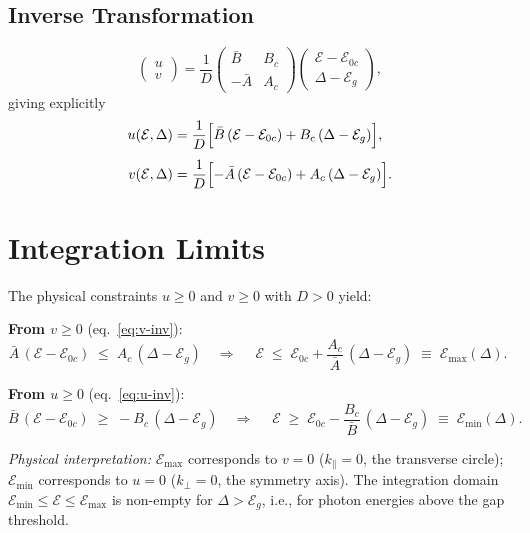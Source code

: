 \documentclass[11pt,a4paper]{article}
\newcommand{\E}{\mathcal{E}}              %
\newcommand{\Eoc}{\E_{0c}}
\newcommand{\Eg}{\E_g}
\newcommand{\Emax}{\E_{\max}}
\newcommand{\Emin}{\E_{\min}}
\newcommand{\Abar}{\bar{A}}
\newcommand{\Bbar}{\bar{B}}
\newcommand{\kperp}{k_{\!\perp}}
\newcommand{\kpar}{k_{\!\parallel}}
\begin{document}
\subsection{Inverse Transformation}

\begin{equation}\label{eq:inverse}
  \begin{pmatrix} u \\ v \end{pmatrix}
  = \frac{1}{D}
  \begin{pmatrix} \Bbar & B_c \\ -\Abar & A_c \end{pmatrix}
  \begin{pmatrix} \E - \Eoc \\ \Delta - \Eg \end{pmatrix},
\end{equation}
giving explicitly
\begin{align}
  u(\E, \Delta) &= \frac{1}{D}\Bigl[\Bbar\,(\E - \Eoc) + B_c\,(\Delta - \Eg)\Bigr], \label{eq:u-inv}\\[4pt]
  v(\E, \Delta) &= \frac{1}{D}\Bigl[-\Abar\,(\E - \Eoc) + A_c\,(\Delta - \Eg)\Bigr]. \label{eq:v-inv}
\end{align}

\section{Integration Limits}\label{sec:limits}

The physical constraints $u \geq 0$ and $v \geq 0$ with $D > 0$ yield:

\medskip
\textbf{From $v \geq 0$} \;(eq.~\ref{eq:v-inv}):
\begin{equation}\label{eq:Emax}
  \Abar\,(\E - \Eoc) \;\leq\; A_c\,(\Delta - \Eg)
  \quad\Longrightarrow\quad
  \boxed{\;
    \E \;\leq\; \Eoc + \frac{A_c}{\Abar}\,(\Delta - \Eg)
    \;\equiv\; \Emax(\Delta).
  \;}
\end{equation}

\textbf{From $u \geq 0$} \;(eq.~\ref{eq:u-inv}):
\begin{equation}\label{eq:Emin}
  \Bbar\,(\E - \Eoc) \;\geq\; -B_c\,(\Delta - \Eg)
  \quad\Longrightarrow\quad
  \boxed{\;
    \E \;\geq\; \Eoc - \frac{B_c}{\Bbar}\,(\Delta - \Eg)
    \;\equiv\; \Emin(\Delta).
  \;}
\end{equation}

\textit{Physical interpretation:}
$\Emax$ corresponds to $v=0$ ($\kpar = 0$, the transverse circle); $\Emin$ corresponds to $u=0$ ($\kperp = 0$, the symmetry axis). The integration domain $\Emin \leq \E \leq \Emax$ is non-empty for $\Delta > \Eg$, i.e., for photon energies above the gap threshold.
\end{document}
